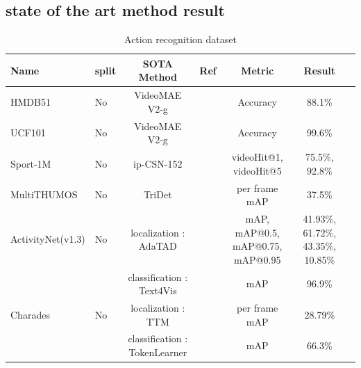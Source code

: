 \documentclass[a4paper]{article}
\begin{document}
\subsection{state of the art method result}

\begin{table}
	\centering
	\smaller[0.5]
	\caption{Action recognition dataset}
	\renewcommand{\arraystretch}{1.5}
	\begin{tabular}{l|l|c c c c c}
		\toprule
		Name                    & split         & SOTA Method                   & Ref                  & Metric                                         & Result                                               \\
		\hline
		HMDB51                  & No            & VideoMAE V2-g                 & \cite{VideoMAEV2g}   & Accuracy                                       & 88.1\%                                             \\
		UCF101                  & No            & VideoMAE V2-g                 & \cite{VideoMAEV2g}   & Accuracy                                       & 99.6\%                                              \\
		Sport-1M                & No            & ip-CSN-152                    & \cite{ip-CSN-152}    & videoHit@1, videoHit@5                         & 75.5\%, 92.8\%                              \\
		MultiTHUMOS             & No            & TriDet                        & \cite{TriDet}        & per frame mAP                                  & 37.5\%                                               \\
		ActivityNet(v1.3)       & No            & localization : AdaTAD         & \cite{AdaTAD}        & mAP, mAP@0.5, mAP@0.75, mAP@0.95               & 41.93\%, 61.72\%, 43.35\%, 10.85\%                      \\ 
		                        &               & classification : Text4Vis     & \cite{Text4Vis}      & mAP                                            & 96.9\%  \\
		Charades                & No            & localization : TTM            & \cite{TTM}           & per frame mAP                                  & 28.79\%                                              \\
		                        &               & classification : TokenLearner & \cite{TokenLearner}  & mAP                                            & 66.3\%       \\

\end{tabular}
\end{table}
\end{document}
